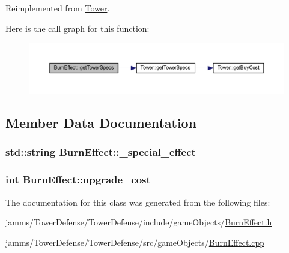 Reimplemented from \hyperlink{class_tower_a2427fab36824f8ec98273cb5e563e0c9}{Tower}.



Here is the call graph for this function\+:\nopagebreak
\begin{figure}[H]
\begin{center}
\leavevmode
\includegraphics[width=350pt]{class_burn_effect_a696db158260eaf01e3b497b6d400230e_cgraph}
\end{center}
\end{figure}




\subsection{Member Data Documentation}
\hypertarget{class_burn_effect_ad58f1d22fde66045dbe00d04873be296}{
\subsubsection[{\+\_\+special\+\_\+effect}]{\setlength{\rightskip}{0pt plus 5cm}std\+::string Burn\+Effect\+::\+\_\+special\+\_\+effect\hspace{0.3cm}{\ttfamily [private]}}}\label{class_burn_effect_ad58f1d22fde66045dbe00d04873be296}
\hypertarget{class_burn_effect_a11035a16e0bb8e1bd21e95d256d1c570}{
\subsubsection[{upgrade\+\_\+cost}]{\setlength{\rightskip}{0pt plus 5cm}int Burn\+Effect\+::upgrade\+\_\+cost\hspace{0.3cm}{\ttfamily [static]}}}\label{class_burn_effect_a11035a16e0bb8e1bd21e95d256d1c570}


The documentation for this class was generated from the following files\+:\begin{DoxyCompactItemize}
\item 
jamms/\+Tower\+Defense/\+Tower\+Defense/include/game\+Objects/\hyperlink{_burn_effect_8h}{Burn\+Effect.\+h}\item 
jamms/\+Tower\+Defense/\+Tower\+Defense/src/game\+Objects/\hyperlink{_burn_effect_8cpp}{Burn\+Effect.\+cpp}\end{DoxyCompactItemize}
